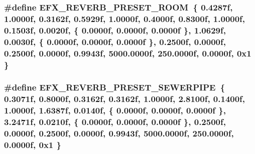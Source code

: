 \subsubsection[{\texorpdfstring{E\+F\+X\+\_\+\+R\+E\+V\+E\+R\+B\+\_\+\+P\+R\+E\+S\+E\+T\+\_\+\+R\+O\+OM}{EFX_REVERB_PRESET_ROOM}}]{\setlength{\rightskip}{0pt plus 5cm}\#define E\+F\+X\+\_\+\+R\+E\+V\+E\+R\+B\+\_\+\+P\+R\+E\+S\+E\+T\+\_\+\+R\+O\+OM~\{ 0.\+4287f, 1.\+0000f, 0.\+3162f, 0.\+5929f, 1.\+0000f, 0.\+4000f, 0.\+8300f, 1.\+0000f, 0.\+1503f, 0.\+0020f, \{ 0.\+0000f, 0.\+0000f, 0.\+0000f \}, 1.\+0629f, 0.\+0030f, \{ 0.\+0000f, 0.\+0000f, 0.\+0000f \}, 0.\+2500f, 0.\+0000f, 0.\+2500f, 0.\+0000f, 0.\+9943f, 5000.\+0000f, 250.\+0000f, 0.\+0000f, 0x1 \}}\hypertarget{efx-presets_8h_ade1399e441c36d69b5ae54171f3fc4c5}{}\label{efx-presets_8h_ade1399e441c36d69b5ae54171f3fc4c5}
\subsubsection[{\texorpdfstring{E\+F\+X\+\_\+\+R\+E\+V\+E\+R\+B\+\_\+\+P\+R\+E\+S\+E\+T\+\_\+\+S\+E\+W\+E\+R\+P\+I\+PE}{EFX_REVERB_PRESET_SEWERPIPE}}]{\setlength{\rightskip}{0pt plus 5cm}\#define E\+F\+X\+\_\+\+R\+E\+V\+E\+R\+B\+\_\+\+P\+R\+E\+S\+E\+T\+\_\+\+S\+E\+W\+E\+R\+P\+I\+PE~\{ 0.\+3071f, 0.\+8000f, 0.\+3162f, 0.\+3162f, 1.\+0000f, 2.\+8100f, 0.\+1400f, 1.\+0000f, 1.\+6387f, 0.\+0140f, \{ 0.\+0000f, 0.\+0000f, 0.\+0000f \}, 3.\+2471f, 0.\+0210f, \{ 0.\+0000f, 0.\+0000f, 0.\+0000f \}, 0.\+2500f, 0.\+0000f, 0.\+2500f, 0.\+0000f, 0.\+9943f, 5000.\+0000f, 250.\+0000f, 0.\+0000f, 0x1 \}}\hypertarget{efx-presets_8h_a51a0c280deb8768e50ec99bb8afd00f7}{}\label{efx-presets_8h_a51a0c280deb8768e50ec99bb8afd00f7}

